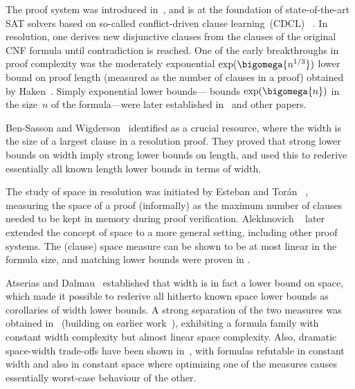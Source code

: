 \documentclass{toc}
\begin{document}

The  proof system was introduced
in~\cite{Blake37Thesis}, and is at the foundation
of state-of-the-art SAT solvers based on so-called conflict-driven
clause learning~(CDCL)~%
\cite{BS97UsingCSP,MS99Grasp,MMZZM01Engineering}.
%
In resolution, one derives new disjunctive clauses 
from the clauses of the original CNF formula until 
contradiction is reached.
One of the early breakthroughs in proof complexity was the
%
%
%
moderately exponential %
%
%
%
%
%
%
$\exp(\bigomega{n^{1/3}})$   %
lower bound on proof length 
(measured as the number of clauses in a proof)
obtained by Haken~\cite{Haken85Intractability}.
%
Simply   %
exponential lower bounds---\ieComma
bounds $\exp(\bigomega{n})$
in the size~$n$ of the formula---were 
later  established in~%
\cite{CS88ManyHard,Urquhart87HardExamples}
and other papers.


Ben-Sasson and Wigderson~\cite{BW01ShortProofs}
identified 
as a crucial resource, where the width is the
size of a largest clause in a resolution proof.
They proved that strong lower bounds on width imply strong lower
bounds on length, and used this to rederive essentially all known
length lower bounds in terms of width.

The study of space in resolution was initiated by Esteban and Tor\'an~%
\cite{ET01SpaceBounds}, measuring the space of a proof (informally) as
the maximum number of clauses needed to be kept in memory during proof
verification. Alekhnovich \etal~\cite{ABRW02SpaceComplexity}
later extended the concept of space to a more general setting,
including other proof systems.
The (clause) space measure can be shown to be at most linear in the
formula size, and matching lower bounds were proven in
\cite{ABRW02SpaceComplexity,
  BG03SpaceComplexity,
  ET01SpaceBounds}.

Atserias and Dalmau~%
\cite{AD08CombinatoricalCharacterization}
established that %
width
is in fact
%
%
%
a lower bound on space, %
which made it possible
to rederive all hitherto known space lower bounds as corollaries of
width lower bounds.
%
A strong separation of the two measures
%
was obtained in~%
\cite{BN08ShortProofs}
(building on earlier 
work~\cite{Nordstrom09NarrowProofsSICOMP,NH13TowardsOptimalSeparation}),
exhibiting a formula family
with constant width complexity but almost
linear space complexity. 
%
Also, dramatic space-width trade-offs have been shown
in~\cite{Ben-Sasson09SizeSpaceTradeoffs}, 
with formulas refutable in constant width and
also in  %
constant space
%
where optimizing one of the
measures causes essentially worst-case behaviour of the 
other.
%
\end{document}

